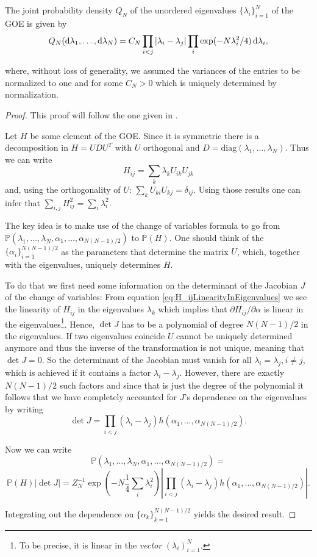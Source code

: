 \begin{theorem}\label{thm:probabilitydensityofEV}
	The joint probability density $Q_N$ of the unordered eigenvalues $\{\lambda_i\}_{i=1}^N$ of the GOE is given by
	$$Q_N(\mathop{}\!\mathrm{d}\lambda_1,\dots,\mathop{}\!\mathrm{d}\lambda_N) = C_N\prod_{i<j}|\lambda_i-\lambda_j|\prod_i\exp(-N\lambda_i^2/4)\mathop{}\!\mathrm{d}\lambda_i,$$
	
	where, without loss of generality, we assumed the variances of the entries to be normalized to one and for some $C_N>0$ which is uniquely determined by normalization.
\end{theorem}
\begin{proof}
	This proof will follow the one given in \cite{LiuEigenvalues}.
	
	Let $H$ be some element of the GOE. Since it is symmetric there is a decomposition in $H=UDU^T$ with $U$ orthogonal and $D=\text{diag}(\lambda_1,\dots,\lambda_N)$. Thus we can write 
	\begin{equation}\label{eq:H_ijLinearityInEigenvalues}
		H_{ij} = \sum_k \lambda_k U_{ik}U_{jk}
	\end{equation}	
	and, using the orthogonality of $U$: $\sum_k U_{ki}U_{kj}=\delta_{ij}$. Using those results one can infer that $\sum_{i,j}H_{ij}^2=\sum_i \lambda_i^2$.
	
	The key idea is to make use of the change of variables formula to go from $\mathbb P(\lambda_1,\dots,\lambda_N,\alpha_1,\dots,\alpha_{N(N-1)/2})$ to $\mathbb P(H)$. One should think of the $\{\alpha_i\}_{i=1}^{N(N-1)/2}$ as the parameters that determine the matrix $U$, which, together with the eigenvalues, uniquely determines $H$.
	
	To do that we first need some information on the determinant of the Jacobian $J$ of the change of variables:
	From equation \ref{eq:H_ijLinearityInEigenvalues} we see the linearity of $H_{ij}$ in the eigenvalues $\lambda_k$ which implies that $\partial H_{ij}/\partial\alpha$ is linear in the eigenvalues\footnote{To be precise, it is linear in the \textit{vector} $(\lambda_i)_{i=1}^N$.}. Hence, $\det J$ has to be a polynomial of degree $N(N-1)/2$ in the eigenvalues. If two eigenvalues coincide $U$ cannot be uniquely determined anymore and thus the inverse of the transformation is not unique, meaning that $\det J=0$. So the determinant of the Jacobian must vanish for all $\lambda_i=\lambda_j, i\neq j$, which is achieved if it contains a factor $\lambda_i-\lambda_j$. However, there are exactly $N(N-1)/2$ such factors and since that is just the degree of the polynomial it follows that we have completely accounted for $J$'s dependence on the eigenvalues by writing $$\det J=\prod_{i<j}(\lambda_i-\lambda_j) h(\alpha_1,\dots,\alpha_{N(N-1)/2}).$$
	
	Now we can write
	$$\mathbb P(\lambda_1,\dots,\lambda_N,\alpha_1,\dots,\alpha_{N(N-1)/2}) = $$
	$$\mathbb P(H)|\det J|=Z_N^{-1}\exp\left(-N\frac{1}{4}\sum_i\lambda_i^2\right)|\prod_{i<j}(\lambda_i-\lambda_j) h(\alpha_1,\dots,\alpha_{N(N-1)/2})|.$$
	
	Integrating out the dependence on $\{\alpha_k\}_{k=1}^{N(N-1)/2}$ yields the desired result.
\end{proof}


